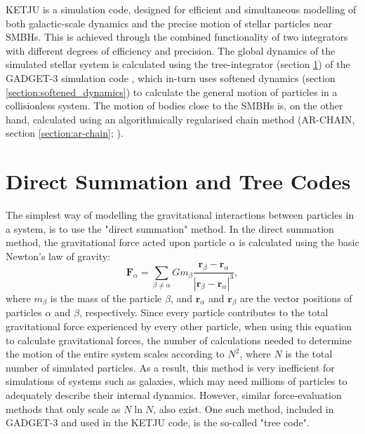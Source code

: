 \documentclass[english, twoside]{HYgradu}
\begin{document}
KETJU \citep{Rantala2017KETJU} is a simulation code, designed for efficient and simultaneous modelling of both galactic-scale dynamics and the precise motion of stellar particles near SMBHs. This is achieved through the combined functionality of two integrators with different degrees of efficiency and precision. The global dynamics of the simulated stellar system is calculated using the tree-integrator (section \ref{section:tree}) of the GADGET-3 simulation code \citep{Springel2005}, which in-turn uses softened dynamics (section \ref{section:softened_dynamics}) to calculate the general motion of particles in a collisionless system. The motion of bodies close to the SMBHs is, on the other hand, calculated using an algorithmically regularised chain method (AR-CHAIN, section \ref{section:ar-chain}; \citealt{Mikkola2008ARCHAIN}).

\section{Direct Summation and Tree Codes} \label{section:tree}

The simplest way of modelling the gravitational interactions between particles in a system, is to use the "direct summation" method. In the direct summation method, the gravitational force acted upon particle $\alpha$ is calculated using the basic Newton's law of gravity:
\begin{equation}
\mathbf{F}_\alpha = \displaystyle\sum_{\beta \neq \alpha} Gm_\beta \frac{\mathbf{r}_\beta-\mathbf{r}_\alpha}{|\mathbf{r}_\beta-\mathbf{r}_\alpha|^3}, \label{eq:f_alpha}
\end{equation}
where $m_\beta$ is the mass of the particle $\beta$, and $\mathbf{r}_\alpha$ and $\mathbf{r}_\beta$ are the vector positions of particles $\alpha$ and $\beta$, respectively. Since every particle contributes to the total gravitational force experienced by every other particle, when using this equation to calculate gravitational forces, the number of calculations needed to determine the motion of the entire system scales according to $N^2$, where $N$ is the total number of simulated particles. As a result, this method is very inefficient for simulations of systems such as galaxies, which may need millions of particles to adequately describe their internal dynamics. However, similar force-evaluation methods that only scale as $N\ln N$, also exist. One such method, included in GADGET-3 and used in the KETJU code, is the so-called "tree code".
\end{document}
